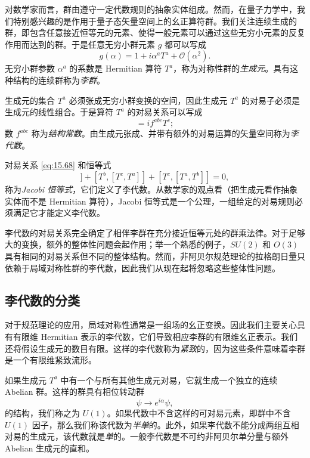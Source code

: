 对数学家而言，群由遵守一定代数规则的抽象实体组成。然而，在量子力学中，我们特别感兴趣的是作用于量子态矢量空间上的幺正算符群。我们关注连续生成的群，即包含任意接近恒等元的元素、使得一般元素可以通过这些无穷小元素的反复作用而达到的群。于是任意无穷小群元素 $g$ 都可以写成
\begin{equation}
  g(\alpha) = 1 + i\alpha^a T^a + \mathcal{O}(\alpha^2) .
  \label{eq:15.67}
\end{equation}
无穷小群参数 $\alpha^a$ 的系数是 Hermitian 算符 $T^a$，称为对称性群的\emph{生成元}。具有这种结构的连续群称为\emph{李群}。

生成元的集合 $T^a$ 必须张成无穷小群变换的空间，因此生成元 $T^a$ 的对易子必须是生成元的线性组合。于是算符 $T^a$ 的对易关系可以写成
\begin{equation}
  [T^a, T^b] = if^{abc}T^c ;
  \label{eq:15.68}
\end{equation}
数 $f^{abc}$ 称为\emph{结构常数}。由生成元张成、并带有额外的对易运算的矢量空间称为\emph{李代数}。

对易关系 \eqref{eq:15.68} 和恒等式
\begin{equation}
  [T^a, [T^b, T^c]] + [T^b, [T^c, T^a]] + [T^c, [T^a, T^b]] = 0 ,
  \label{eq:15.70}
\end{equation}
称为\emph{Jacobi 恒等式}，它们定义了李代数。从数学家的观点看（把生成元看作抽象实体而不是 Hermitian 算符），Jacobi 恒等式是一个公理，一组给定的对易规则必须满足它才能定义李代数。

李代数的对易关系完全确定了相伴李群在充分接近恒等元处的群乘法律。对于足够大的变换，额外的整体性问题会起作用；举一个熟悉的例子，$SU(2)$ 和 $O(3)$ 具有相同的对易关系但不同的整体结构。然而，非阿贝尔规范理论的拉格朗日量只依赖于局域对称性群的李代数，因此我们从现在起将忽略这些整体性问题。

\subsection{李代数的分类}

对于规范理论的应用，局域对称性通常是一组场的幺正变换。因此我们主要关心具有有限维 Hermitian 表示的李代数，它们导致相应李群的有限维幺正表示。我们还将假设生成元的数目有限。这样的李代数称为\emph{紧致}的，因为这些条件意味着李群是一个有限维紧致流形。

如果生成元 $T^a$ 中有一个与所有其他生成元对易，它就生成一个独立的连续 Abelian 群。这样的群具有相位转动群
\begin{equation}
  \psi \to e^{i\alpha}\psi ,
  \label{eq:15.71}
\end{equation}
的结构，我们称之为 $U(1)$。如果代数中不含这样的可对易元素，即群中不含 $U(1)$ 因子，那么我们称该代数为\emph{半单}的。此外，如果李代数不能分成两组互相对易的生成元，该代数就是\emph{单}的。一般李代数是不可约非阿贝尔单分量与额外 Abelian 生成元的直和。

